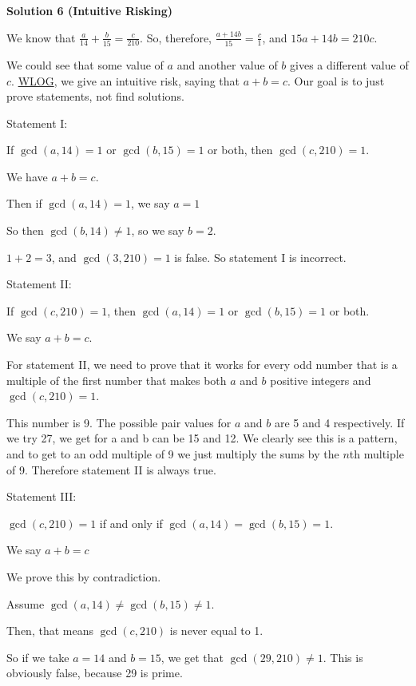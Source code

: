 \begin{enumerate}
\textbf{Solution 6 (Intuitive Risking)}

We know that \( \frac{a}{14} + \frac{b}{15} = \frac{c}{210} \). So, therefore, \( \frac{a + 14b}{15} = \frac{c}{1} \), and \( 15a + 14b = 210c \).

 We could see that some value of \(a\) and another value of \(b\) gives a different value of \(c\). \href{https://artofproblemsolving.com/wiki/index.php?title=WLOG}{WLOG}, we give an intuitive risk, saying that \( a + b = c \). Our goal is to just prove statements, not find solutions.

 Statement I:

 If \( \gcd(a,14) = 1 \) or \( \gcd(b,15) = 1 \) or both, then \( \gcd(c,210) = 1 \).

 We have \( a + b = c \).

 Then if \( \gcd(a,14) = 1 \), we say \( a = 1 \)

 So then \( \gcd(b,14) \neq 1 \), so we say \( b = 2 \).

 \( 1 + 2 = 3 \), and \( \gcd(3,210) = 1 \) is false. So statement I is incorrect.

 Statement II:

 If \( \gcd(c,210) = 1 \), then \( \gcd(a,14) = 1 \) or \( \gcd(b,15) = 1 \) or both.

 We say  \( a + b = c \).

 For statement II, we need to prove that it works for every odd number that is a multiple of the first number that makes both \(a\) and \(b\) positive integers and \( \gcd(c,210) = 1 \). 

 This number is 9. The possible pair values for \(a\) and \(b\) are 5 and 4 respectively. If we try 27, we get for a and b can be 15 and 12. We clearly see this is a pattern, and to get to an odd multiple of 9 we just multiply the sums by the \( n \)th multiple of 9. Therefore statement II is always true.

 Statement III:

 \( \gcd(c,210) = 1 \) if and only if \( \gcd(a,14) = \gcd(b,15) = 1 \).

 We say \( a + b = c \)

 We prove this by contradiction. 

 Assume \( \gcd(a,14) \neq \gcd(b,15) \neq 1 \). 

 Then, that means \( \gcd(c,210) \) is never equal to 1. 

 So if we take \( a = 14 \) and \( b = 15 \), we get that \( \gcd(29,210) \neq 1 \). This is obviously false, because 29 is prime. 


\end{enumerate}
